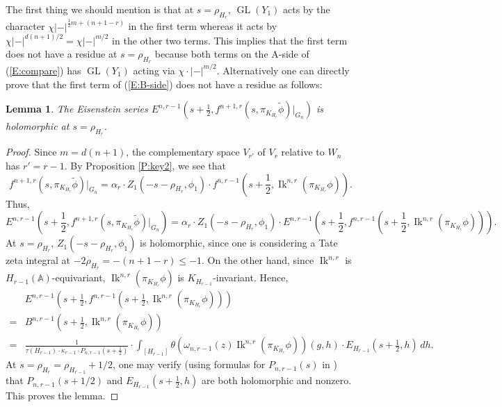 \documentclass[10pt]{amsart}
\theoremstyle{plain}
\newtheorem{Lem}[equation]{Lemma}
\numberwithin{equation}{section}
\begin{document}
 The first thing we should mention is that at $s = \rho_{H_r}$,
 ${\operatorname{GL}}(Y_1)$ acts by the character
 $\chi |-|^{\frac{1}{2} m + (n+1-r)}$  in the first term whereas it
 acts by $\chi |-|^{d(n+1)/2} =\chi |-|^{m/2}$ in the other two
 terms. This implies that the first term does not have a residue at $s
 = \rho_{H_r}$ because both terms on the A-side of (\ref{E:compare}) has
 ${\operatorname{GL}}(Y_1)$ acting via $\chi \cdot |-|^{m/2}$. Alternatively one
 can directly prove that the first term of (\ref{E:B-side}) does not have a
 residue as follows:
 \begin{Lem}
 The Eisenstein series $E^{n,r-1}(s+\frac{1}{2},  f^{n+1,r}(s,
 \pi_{K_{H_r}} \tilde{\phi})|_{G_{n}})$ is holomorphic at $s =
 \rho_{H_r}$. 
 \end{Lem}
 \begin{proof}
 Since $m = d(n+1)$, the complementary space $V_{r'}$ of $V_r$ relative to $W_n$ has $r' = r-1$.  
 By Proposition \ref{P:key2}, we see that
 \[ f^{n+1,r}(s, \pi_{K_{H_r}} \tilde{\phi})|_{G_{n}}  
  = \alpha_r \cdot  Z_1(- s  - \rho_{H_r}, \phi_1) \cdot  f^{n,r-1}(
  s + \frac{1}{2},  {\operatorname{Ik}}^{n,r}(\pi_{K_{H_r}}\phi)). \] 
   Thus,
  \[  E^{n,r-1}(s+\frac{1}{2},  f^{n+1,r}(s, \pi_{K_{H_r}} \tilde{\phi})|_{G_{n}})
  = \alpha_r \cdot  Z_1( -s  - \rho_{H_r}, \phi_1) \cdot E^{n, r-1}
  (s+\frac{1}{2}, f^{n,r-1}(  s + \frac{1}{2},
  {\operatorname{Ik}}^{n,r}(\pi_{K_{H_r}} \phi))).  \]
  At $s = \rho_{H_r}$, 
  $Z_1(-s - \rho_{H_r}, \phi_1)$ is holomorphic,   since one is
  considering a Tate zeta integral at $-2 \rho_{H_r}  = -( n+1-r) \leq
  -1$. On the other hand, since ${\operatorname{Ik}}^{n,r}$ is
  $H_{r-1}({\mathbb{A}})$-equivariant,
  ${\operatorname{Ik}}^{n,r}(\pi_{K_{H_r}} \phi)$ is $K_{H_{r-1}}$-invariant. Hence,
  \begin{align*}
  &E^{n, r-1} (s+\frac{1}{2}, f^{n,r-1}(  s + \frac{1}{2},  {\operatorname{Ik}}^{n,r}(\pi_{K_{H_r}}\phi)))\\
  = &B^{n, r-1}(s+\frac{1}{2} ,  {\operatorname{Ik}}^{n,r}(\pi_{K_{H_r}}\phi))\\ 
  =  &\frac{1}{\tau(H_{r-1}) \cdot \kappa_{r-1}\cdot P_{n,r-1}(s+\frac{1}{2})} \cdot
  \int_{[H_{r-1}]} \theta(\omega_{n,r-1}(z) {\operatorname{Ik}}^{n,r}(\pi_{K_{H_r}}
  \phi))(g,h) \cdot E_{H_{r-1}}(s+\frac{1}{2},h) \, dh.
  \end{align*} 
 At $s = \rho_{H_r} = \rho_{H_{r-1}} + 1/2$,  one may verify (using formulas for 
 $P_{n,r-1}(s)$ in \cite{KR5, I2, JS}) that
 $P_{n,r-1}(s +1/2)$ and $ E_{H_{r-1}}(s+\frac{1}{2}, h)$ are both
 holomorphic and nonzero. This proves the lemma. 
  \end{proof}
\end{document}
